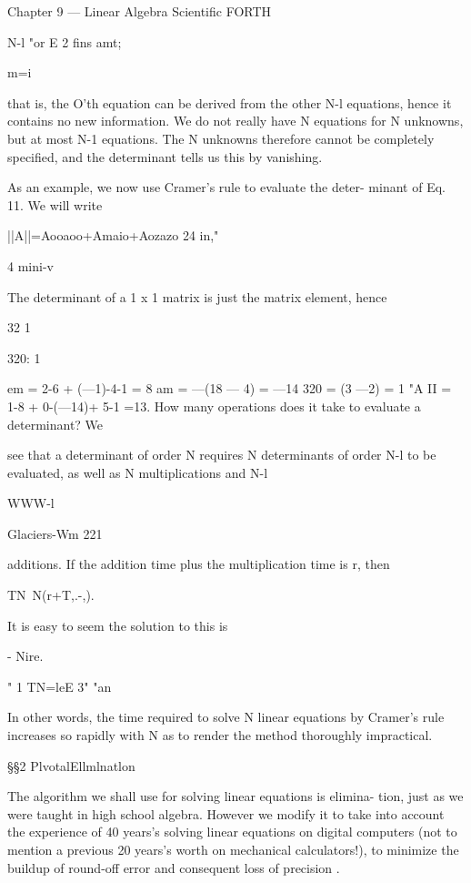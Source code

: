 {Chapter 9 — Linear Algebra Scientiﬁc FORTH

N-l
"or E 2 ﬁns amt;

m=i

that is, the O'th equation can be derived from the other N-l
equations, hence it contains no new information. We do not really
have N equations for N unknowns, but at most N-1 equations. The
N unknowns therefore cannot be completely speciﬁed, and the
determinant tells us this by vanishing.

As an example, we now use Cramer's rule to evaluate the deter-
minant of Eq. 11. We will write

||A||=Aooaoo+Amaio+Aozazo
24
in,"

4
mini-v

The determinant of a 1 x 1 matrix is just the matrix element, hence

32
1

320: 1

 

 

 

em = 2-6 + (—1)-4-1 = 8
am = —(18 — 4) = —14
320 = (3 —2) = 1
"A II = 1-8 + 0-(—14)+ 5-1 =13.
How many operations does it take to evaluate a determinant? We

see that a determinant of order N requires N determinants of
order N-l to be evaluated, as well as N multiplications and N-l

WWW-l

Glaciers-Wm 221

additions. If the addition time plus the multiplication time is r,
then

TN~N(r+T,.-,).

It is easy to seem the solution to this is

- Nire.

" 1
TN=leE 3" "an

In other words, the time required to solve N linear equations by
Cramer's rule increases so rapidly with N as to render the method
thoroughly impractical.

\S\S2 PlvotalEllmlnatlon

The algorithm we shall use for solving linear equations is elimina-
tion, just as we were taught in high school algebra. However we
modify it to take into account the experience of 40 years's solving
linear equations on digital computers (not to mention a previous
20 years's worth on mechanical calculators!), to minimize the
buildup of round-off error and consequent loss of precision .

}
